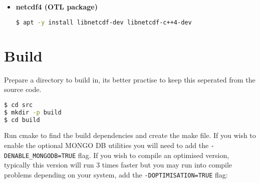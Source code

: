 \begin{itemize}
\begin{lstlisting}[language=bash]
$ cd mongo-c-driver-1.17.1/
$ mkdir cmakebuild
$ cd cmakebuild/
$ cmake -DENABLE_AUTOMATIC_INIT_AND_CLEANUP=OFF ..
$ cmake --build .
$ sudo cmake --build . --target install

$ cd ../../
$ curl -OL https://github.com/mongodb/mongo-cxx-driver/releases/download/r3.6.0/mongo-cxx-driver-r3.6.0.tar.gz
$ tar -xzf mongo-cxx-driver-r3.6.0.tar.gz

$ cd mongo-cxx-driver-r3.6.0/

$ cd build/
$ cmake -DCMAKE_BUILD_TYPE=Release -DCMAKE_INSTALL_PREFIX=/usr/local ..
$ sudo cmake --build . --target EP_mnmlstc_core
$ cmake --build .
$ sudo cmake --build . --target install

$ wget -qO - https://www.mongodb.org/static/pgp/server-4.4.asc | sudo apt-key add -
$ echo "deb [ arch=amd64,arm64 ] https://repo.mongodb.org/apt/ubuntu focal/mongodb-org/4.4 multiverse" | sudo tee /etc/apt/sources.list.d/mongodb-org-4.4.list
$ echo "deb [ arch=amd64,arm64 ] https://repo.mongodb.org/apt/ubuntu bionic/mongodb-org/4.4 multiverse" | sudo tee /etc/apt/sources.list.d/mongodb-org-4.4.list

$ sudo apt update
$ sudo apt install mongodb-org 

$ sudo systemctl start mongod
$ sudo systemctl status mongod
$ mongod
\end{lstlisting}

\item\textbf{netcdf4 (OTL package)}

\begin{lstlisting}[language=bash]
$ apt -y install libnetcdf-dev libnetcdf-c++4-dev
\end{lstlisting}

\end{itemize}

\section{Build}\label{build}

Prepare a directory to build in, its better practise to keep this
seperated from the source code.

\begin{lstlisting}[language=bash]
$ cd src
$ mkdir -p build
$ cd build
\end{lstlisting}

Run cmake to find the build dependencies and create the make file. If
you wish to enable the optional MONGO DB utilities you will need to add
the \texttt{-DENABLE\_MONGODB=TRUE} flag. If you wish to compile an
optimised version, typically this version will run 3 times faster but
you may run into compile problems depending on your system, add the
\texttt{-DOPTIMISATION=TRUE} flag:


